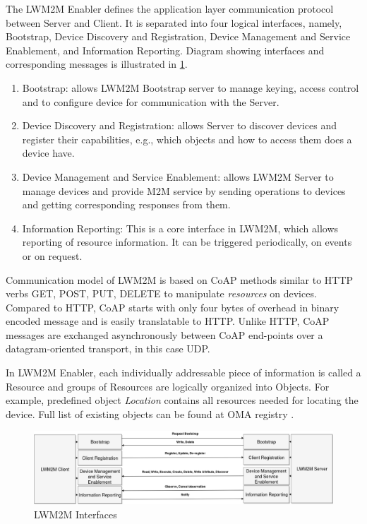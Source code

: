 The LWM2M Enabler defines the application layer communication protocol between Server and Client. It is separated into four logical interfaces, namely, Bootstrap, Device Discovery and Registration, Device Management and Service Enablement, and Information Reporting. Diagram showing interfaces and corresponding messages is illustrated in \ref{fig:LWM2MInterfaces}.

\begin{enumerate}
	\setlength{\itemsep}{1pt}
	\item Bootstrap: allows LWM2M Bootstrap server to manage keying, access control and to configure device for communication with the Server.
	\item Device Discovery and Registration: allows Server to discover devices and register their capabilities, e.g., which objects and how to access them does a device have.
	\item Device Management and Service Enablement: allows LWM2M Server to manage devices and provide M2M service by sending operations to devices and getting corresponding responses from them.
	\item Information Reporting: This is a core interface in LWM2M, which allows reporting of resource information. It can be triggered periodically, on events or on request.
\end{enumerate}

Communication model of LWM2M is based on CoAP methods similar to HTTP verbs GET, POST, PUT, DELETE to manipulate \emph{resources} on devices. Compared to HTTP, CoAP starts with only four bytes of overhead in binary encoded message and is easily translatable to HTTP. Unlike HTTP, CoAP messages are exchanged asynchronously between CoAP end-points over a datagram-oriented transport, in this case UDP.

In LWM2M Enabler, each individually addressable piece of information is called a Resource and groups of Resources are logically organized into Objects. For example, predefined object \emph{Location} contains all resources needed for locating the device. Full list of existing objects can be found at OMA registry \cite{OMA}.

\begin{figure}[ht]
	\begin{center}
		\includegraphics[width=\textwidth]{images/LWM2M-Interfaces}
		\caption{LWM2M Interfaces}
		\label{fig:LWM2MInterfaces}
	\end{center}
\end{figure}

